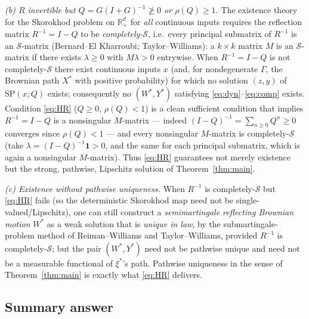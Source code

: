 \documentclass{amsart}
\theoremstyle{definition}
\theoremstyle{remark}
\newcommand{\R}{\mathbb{R}}
\begin{document}
\emph{(b) $R$ invertible but $Q=G(I+G)^{-1}\not\ge0$ or $\rho(Q)\ge1$.} The
existence theory for the Skorokhod problem on $\R_+^d$ for \emph{all} continuous
inputs requires the reflection matrix $R^{-1}=I-Q$ to be \emph{completely-}$\mathcal S$,
i.e.\ every principal submatrix of $R^{-1}$ is an $\mathcal S$-matrix (Bernard--El
Kharroubi; Taylor--Williams): a $k\times k$ matrix $M$ is an $\mathcal S$-matrix
if there exists $\lambda\ge0$ with $M\lambda>0$ entrywise. When $R^{-1}=I-Q$ is
not completely-$\mathcal S$ there exist continuous inputs $x$ (and, for
nondegenerate $\Gamma$, the Brownian path $X^\ast$ with positive probability)
for which no solution $(z,y)$ of $\mathrm{SP}(x;Q)$ exists; consequently no
$(W^\ast,Y^\ast)$ satisfying \eqref{eq:dyn}--\eqref{eq:comp} exists.
Condition \eqref{eq:HR} ($Q\ge0$, $\rho(Q)<1$) is a clean sufficient condition
that implies $R^{-1}=I-Q$ is a nonsingular $M$-matrix --- indeed
$(I-Q)^{-1}=\sum_{n\ge0}Q^n\ge0$ converges since $\rho(Q)<1$ --- and every
nonsingular $M$-matrix is completely-$\mathcal S$ (take $\lambda=(I-Q)^{-1}\mathbf
1>0$, and the same for each principal submatrix, which is again a nonsingular
$M$-matrix). Thus \eqref{eq:HR} guarantees not merely existence but the strong,
pathwise, Lipschitz solution of Theorem~\ref{thm:main}.

\emph{(c) Existence without pathwise uniqueness.} When $R^{-1}$ is
completely-$\mathcal S$ but \eqref{eq:HR} fails (so the deterministic Skorokhod
map need not be single-valued/Lipschitz), one can still construct a
\emph{semimartingale reflecting Brownian motion} $W^\ast$ as a weak solution
that is \emph{unique in law}, by the submartingale-problem method of
Reiman--Williams and Taylor--Williams, provided $R^{-1}$ is completely-$\mathcal S$;
but the pair $(W^\ast,Y^\ast)$ need not be pathwise unique and need not be a
measurable functional of $\xi^\ast$'s path. Pathwise uniqueness in the sense of
Theorem~\ref{thm:main} is exactly what \eqref{eq:HR} delivers.

\subsection{Summary answer}
\end{document}
